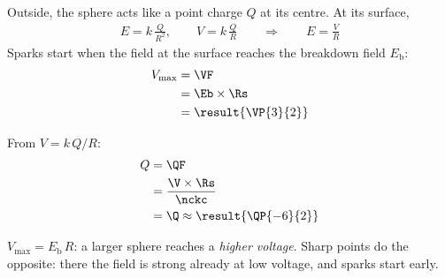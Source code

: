 \begin{abcliste}
\abc Outside, the sphere acts like a point charge $Q$ at its centre. At its surface,
\begin{align}
 E = k\,\frac{Q}{R^2}, \qquad V = k\,\frac{Q}{R} \qquad\Rightarrow\qquad E = \frac{V}{R}
\end{align}
Sparks start when the field at the surface reaches the breakdown field $E_\mathrm{b}$:
\begin{align}
 V_\mathrm{max} &= \VF \\
   &= \Eb\times\Rs \\
   &= \result{\VP{3}{2}}
\end{align}

\abc From $V = k\,Q/R$:
\begin{align}
 Q &= \QF \\
   &= \frac{\V\times\Rs}{\nckc} \\
   &= \Q \approx \result{\QP{-6}{2}}
\end{align}

\abc $V_\mathrm{max} = E_\mathrm{b}\,R$: a larger sphere reaches a \emph{higher voltage}. Sharp points do the opposite: there the field is strong already at low voltage, and sparks start early.
\end{abcliste}
